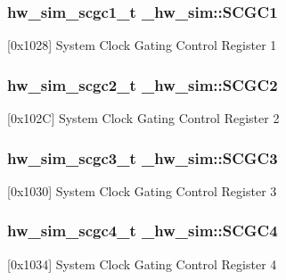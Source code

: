 \subsubsection[{\texorpdfstring{S\+C\+G\+C1}{SCGC1}}]{ {\bf hw\+\_\+sim\+\_\+scgc1\+\_\+t} \+\_\+hw\+\_\+sim\+::\+S\+C\+G\+C1}\hypertarget{struct__hw__sim_aeab3d8ac203265208a8683ca3c2baeeb}{}\label{struct__hw__sim_aeab3d8ac203265208a8683ca3c2baeeb}
\mbox{[}0x1028\mbox{]} System Clock Gating Control Register 1 
\subsubsection[{\texorpdfstring{S\+C\+G\+C2}{SCGC2}}]{ {\bf hw\+\_\+sim\+\_\+scgc2\+\_\+t} \+\_\+hw\+\_\+sim\+::\+S\+C\+G\+C2}\hypertarget{struct__hw__sim_ad6aac0da028db2f1b366a53043d290c8}{}\label{struct__hw__sim_ad6aac0da028db2f1b366a53043d290c8}
\mbox{[}0x102C\mbox{]} System Clock Gating Control Register 2 
\subsubsection[{\texorpdfstring{S\+C\+G\+C3}{SCGC3}}]{ {\bf hw\+\_\+sim\+\_\+scgc3\+\_\+t} \+\_\+hw\+\_\+sim\+::\+S\+C\+G\+C3}\hypertarget{struct__hw__sim_aa943b1ffe3767d3b6391dee2127c5295}{}\label{struct__hw__sim_aa943b1ffe3767d3b6391dee2127c5295}
\mbox{[}0x1030\mbox{]} System Clock Gating Control Register 3 
\subsubsection[{\texorpdfstring{S\+C\+G\+C4}{SCGC4}}]{ {\bf hw\+\_\+sim\+\_\+scgc4\+\_\+t} \+\_\+hw\+\_\+sim\+::\+S\+C\+G\+C4}\hypertarget{struct__hw__sim_a64732632e061710ec708cb124f38dbe7}{}\label{struct__hw__sim_a64732632e061710ec708cb124f38dbe7}
\mbox{[}0x1034\mbox{]} System Clock Gating Control Register 4 
